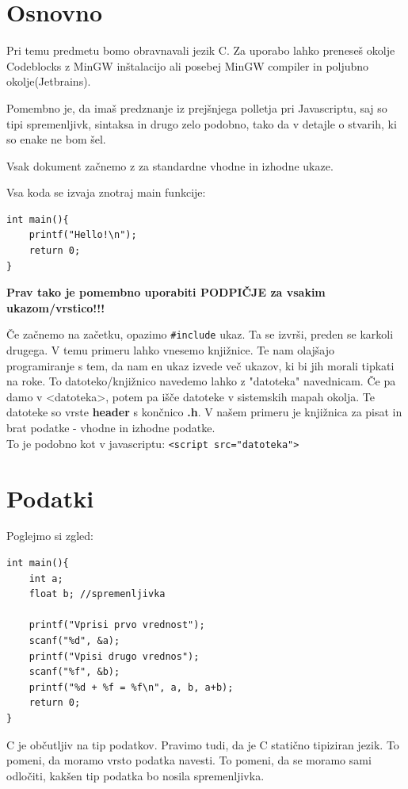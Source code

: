 \documentclass[a4paper, 12pt]{article}
\begin{document}
\section{Osnovno}

Pri temu predmetu bomo obravnavali jezik C. Za uporabo lahko preneseš okolje Codeblocks z MinGW inštalacijo ali posebej MinGW compiler in poljubno okolje(Jetbrains).\

Pomembno je, da imaš predznanje iz prejšnjega polletja pri Javascriptu, saj so tipi spremenljivk, sintaksa in drugo zelo podobno, tako da v detajle o stvarih, ki so enake ne bom šel.

Vsak dokument začnemo z  za standardne vhodne in izhodne ukaze.

Vsa koda se izvaja znotraj main funkcije:

\begin{lstlisting}
int main(){
    printf("Hello!\n");
    return 0;
}
\end{lstlisting}

\textbf{Prav tako je pomembno uporabiti PODPIČJE za vsakim ukazom/vrstico!!!}

Če začnemo na začetku, opazimo \texttt{\#include} ukaz. Ta se izvrši, preden se karkoli drugega. V temu primeru lahko vnesemo knjižnice. Te nam olajšajo programiranje s tem, da nam en ukaz izvede več ukazov, ki bi jih morali tipkati na roke. To datoteko/knjižnico navedemo lahko z "datoteka" navednicam. Če pa damo v <datoteka>, potem pa išče datoteke v sistemskih mapah okolja. Te datoteke so vrste \textbf{header} s končnico \textbf{.h}. V našem primeru je knjižnica za pisat in brat podatke - vhodne in izhodne podatke.\\
To je podobno kot v javascriptu:  \lstinline|<script src="datoteka">|\ 
\section{Podatki}
Poglejmo si zgled:
\begin{lstlisting}[caption = Branje in pisanje podatkov]
int main(){
	int a;
	float b; //spremenljivka

	printf("Vprisi prvo vrednost");
	scanf("%d", &a);
	printf("Vpisi drugo vrednos");
	scanf("%f", &b);
	printf("%d + %f = %f\n", a, b, a+b);
	return 0;
}
\end{lstlisting}

C je občutljiv na tip podatkov. Pravimo tudi, da je C statično tipiziran jezik. To pomeni, da moramo vrsto podatka navesti. 
To pomeni, da se moramo sami odločiti, kakšen tip podatka bo nosila spremenljivka.
\end{document}
